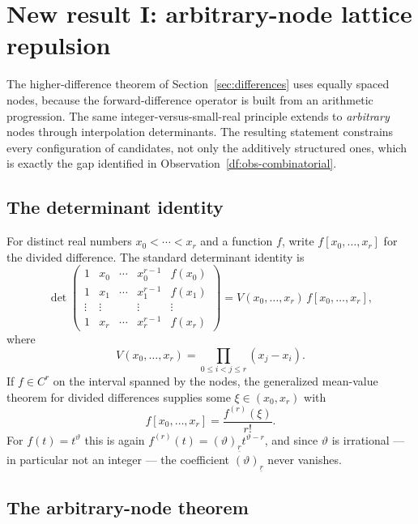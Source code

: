 \documentclass[11pt,oneside]{article}
\theoremstyle{definition}
\theoremstyle{remark}
\newcommand{\thetaq}{\vartheta}
\newcommand{\fall}[2]{\left(#1\right)_{\!\underline{#2}}}
\begin{document}
\section{New result I: arbitrary-node lattice repulsion}
\label{sec:arbnode}

The higher-difference theorem of Section~\ref{sec:differences} uses equally spaced nodes,
because the forward-difference operator is built from an arithmetic progression.  The same
integer-versus-small-real principle extends to \emph{arbitrary} nodes through interpolation
determinants.  The resulting statement constrains every configuration of candidates, not only
the additively structured ones, which is exactly the gap identified in
Observation~\ref{df:obs-combinatorial}.

\subsection{The determinant identity}

For distinct real numbers $x_0<\cdots<x_r$ and a function $f$, write $f[x_0,\ldots,x_r]$ for
the divided difference.  The standard determinant identity is
\begin{equation}
 \det
 \begin{pmatrix}
  1&x_0&\cdots&x_0^{r-1}&f(x_0)\\
  1&x_1&\cdots&x_1^{r-1}&f(x_1)\\
  \vdots&\vdots&&\vdots&\vdots\\
  1&x_r&\cdots&x_r^{r-1}&f(x_r)
 \end{pmatrix}
 =V(x_0,\ldots,x_r)\,f[x_0,\ldots,x_r],
\label{df:det-divdiff}
\end{equation}
where
\[
 V(x_0,\ldots,x_r)=\prod_{0\le i<j\le r}(x_j-x_i).
\]
If $f\in C^{r}$ on the interval spanned by the nodes, the generalized mean-value theorem for
divided differences supplies some $\xi\in(x_0,x_r)$ with
\begin{equation}
 f[x_0,\ldots,x_r]=\frac{f^{(r)}(\xi)}{r!}.
\label{df:divdiff-mvt}
\end{equation}
For $f(t)=t^{\thetaq}$ this is again $f^{(r)}(t)=\fall{\thetaq}{r}t^{\thetaq-r}$, and since
$\thetaq$ is irrational --- in particular not an integer --- the coefficient
$\fall{\thetaq}{r}$ never vanishes.

\subsection{The arbitrary-node theorem}
\end{document}
